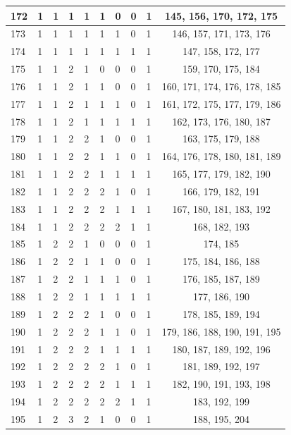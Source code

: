 \begin{longtable}{|l|l|l|l|l|l|l|l|l|c|}
172 & 1 & 1 & 1 & 1 & 1 & 0 & 0 & 1 & 145, 156, 170, 172, 175 \\ \hline
173 & 1 & 1 & 1 & 1 & 1 & 1 & 0 & 1 & 146, 157, 171, 173, 176 \\ \hline
174 & 1 & 1 & 1 & 1 & 1 & 1 & 1 & 1 & 147, 158, 172, 177 \\ \hline
175 & 1 & 1 & 2 & 1 & 0 & 0 & 0 & 1 & 159, 170, 175, 184 \\ \hline
176 & 1 & 1 & 2 & 1 & 1 & 0 & 0 & 1 & 160, 171, 174, 176, 178, 185 \\ \hline
177 & 1 & 1 & 2 & 1 & 1 & 1 & 0 & 1 & 161, 172, 175, 177, 179, 186 \\ \hline
178 & 1 & 1 & 2 & 1 & 1 & 1 & 1 & 1 & 162, 173, 176, 180, 187 \\ \hline
179 & 1 & 1 & 2 & 2 & 1 & 0 & 0 & 1 & 163, 175, 179, 188 \\ \hline
180 & 1 & 1 & 2 & 2 & 1 & 1 & 0 & 1 & 164, 176, 178, 180, 181, 189 \\ \hline
181 & 1 & 1 & 2 & 2 & 1 & 1 & 1 & 1 & 165, 177, 179, 182, 190 \\ \hline
182 & 1 & 1 & 2 & 2 & 2 & 1 & 0 & 1 & 166, 179, 182, 191 \\ \hline
183 & 1 & 1 & 2 & 2 & 2 & 1 & 1 & 1 & 167, 180, 181, 183, 192 \\ \hline
184 & 1 & 1 & 2 & 2 & 2 & 2 & 1 & 1 & 168, 182, 193 \\ \hline
185 & 1 & 2 & 2 & 1 & 0 & 0 & 0 & 1 & 174, 185 \\ \hline
186 & 1 & 2 & 2 & 1 & 1 & 0 & 0 & 1 & 175, 184, 186, 188 \\ \hline
187 & 1 & 2 & 2 & 1 & 1 & 1 & 0 & 1 & 176, 185, 187, 189 \\ \hline
188 & 1 & 2 & 2 & 1 & 1 & 1 & 1 & 1 & 177, 186, 190 \\ \hline
189 & 1 & 2 & 2 & 2 & 1 & 0 & 0 & 1 & 178, 185, 189, 194 \\ \hline
190 & 1 & 2 & 2 & 2 & 1 & 1 & 0 & 1 & 179, 186, 188, 190, 191, 195 \\ \hline
191 & 1 & 2 & 2 & 2 & 1 & 1 & 1 & 1 & 180, 187, 189, 192, 196 \\ \hline
192 & 1 & 2 & 2 & 2 & 2 & 1 & 0 & 1 & 181, 189, 192, 197 \\ \hline
193 & 1 & 2 & 2 & 2 & 2 & 1 & 1 & 1 & 182, 190, 191, 193, 198 \\ \hline
194 & 1 & 2 & 2 & 2 & 2 & 2 & 1 & 1 & 183, 192, 199 \\ \hline
195 & 1 & 2 & 3 & 2 & 1 & 0 & 0 & 1 & 188, 195, 204 \\ \hline

\end{longtable}
